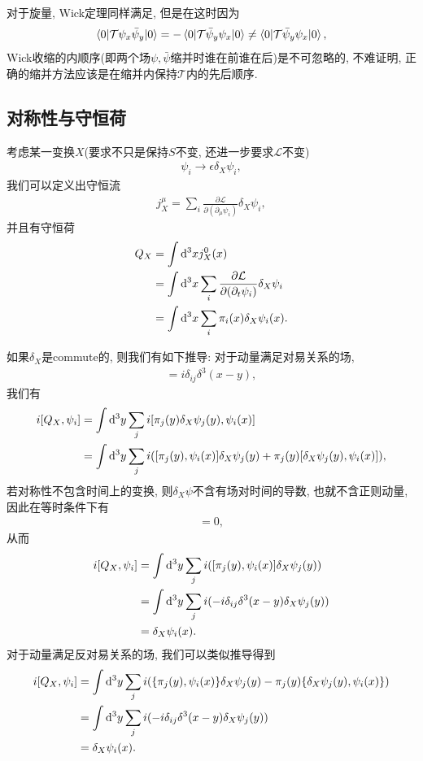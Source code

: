对于旋量, Wick定理同样满足, 但是在这时因为
\begin{equation}
    \braket{0|\mathcal T\psi_x\bar\psi_y|0}=-\braket{0|\mathcal T\bar\psi_y\psi_x|0}\neq\braket{0|\mathcal T\bar\psi_y\psi_x|0},
\end{equation}
Wick收缩的内顺序(即两个场$\psi, \bar\psi$缩并时谁在前谁在后)是不可忽略的, 不难证明, 正确的缩并方法应该是在缩并内保持$\mathcal T$内的先后顺序.

\subsection{对称性与守恒荷}
考虑某一变换$X$(要求不只是保持$S$不变, 还进一步要求$\mathcal L$不变)
\begin{align}
    \psi_i\to\epsilon\delta_X\psi_i,
\end{align}
我们可以定义出守恒流
\begin{align}
    j^\mu_X=\sum_i\frac{\partial\mathcal L}{\partial(\partial_\mu\psi_i)}\delta_X\psi_i,
\end{align}
并且有守恒荷
\begin{align}
    Q_X&=\int\mathrm d^3x j^0_X(x)\\
    &=\int\mathrm d^3x\sum_i\frac{\partial\mathcal L}{\partial(\partial_t\psi_i)}\delta_X\psi_i\notag\\
    &=\int\mathrm d^3x\sum_i \pi_i(x)\delta_X\psi_i(x).
\end{align}

如果$\delta_X$是commute的, 则我们有如下推导:
对于动量满足对易关系的场,
\begin{align}
    [\psi_i(x), \pi_j(y)]=i\delta_{ij}\delta^3(x-y),
\end{align}
我们有
\begin{align}
    i[Q_X, \psi_i]&=\int\mathrm d^3y\sum_j i[\pi_j(y)\delta_X\psi_j(y), \psi_i(x)]\\
    &=\int\mathrm d^3y\sum_j i([\pi_j(y), \psi_i(x)]\delta_X\psi_j(y)+\pi_j(y)[\delta_X\psi_j(y), \psi_i(x)]),
\end{align}
若对称性不包含时间上的变换, 则$\delta_X\psi$不含有场对时间的导数, 也就不含正则动量, 因此在等时条件下有
\begin{align}
    [\delta_X\psi_j(y), \psi_i(x)]=0, 
\end{align}
从而
\begin{align}
    i[Q_X, \psi_i]&=\int\mathrm d^3y\sum_j i([\pi_j(y), \psi_i(x)]\delta_X\psi_j(y))\\
    &=\int\mathrm d^3y\sum_j i(-i\delta_{ij}\delta^3(x-y)\delta_X\psi_j(y))\\
    &=\delta_X\psi_i(x).
\end{align}
对于动量满足反对易关系的场, 我们可以类似推导得到
\begin{align}
    i[Q_X, \psi_i]&=\int\mathrm d^3y\sum_j i(\{\pi_j(y), \psi_i(x)\}\delta_X\psi_j(y)-\pi_j(y)\{\delta_X\psi_j(y), \psi_i(x)\})\\
    &=\int\mathrm d^3y\sum_j i(-i\delta_{ij}\delta^3(x-y)\delta_X\psi_j(y))\\
    &=\delta_X\psi_i(x).
\end{align}

